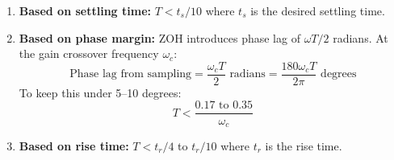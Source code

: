 \begin{enumerate}
    \item \textbf{Based on settling time:} $T < t_s/10$ where $t_s$ is the desired settling time.

    \item \textbf{Based on phase margin:} ZOH introduces phase lag of $\omega T/2$ radians. At the gain crossover frequency $\omega_c$:
    \begin{equation}
    \text{Phase lag from sampling} = \frac{\omega_c T}{2} \text{ radians} = \frac{180 \omega_c T}{2\pi} \text{ degrees}
    \end{equation}
    To keep this under 5--10 degrees:
    \begin{equation}
    T < \frac{0.17 \text{ to } 0.35}{\omega_c}
    \end{equation}

    \item \textbf{Based on rise time:} $T < t_r/4$ to $t_r/10$ where $t_r$ is the rise time.
\end{enumerate}

